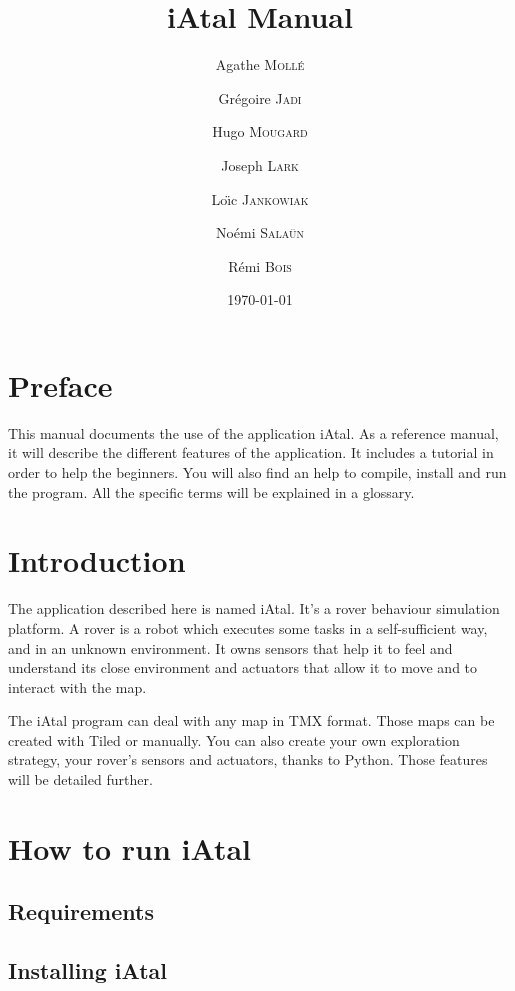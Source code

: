 \documentclass[a4paper,11pt]{article}
\title{iAtal Manual}
\author{Agathe \textsc{Moll\'e} \and Gr\'egoire \textsc{Jadi} \and Hugo \textsc{Mougard} \and Joseph \textsc{Lark} 
\and Lo\"\i c \textsc{Jankowiak} \and No\'emi \textsc{Sala\"un} \and R\'emi \textsc{Bois}}
\date{\today}
\begin{document}
\maketitle

\tableofcontents



\section*{Preface}
This manual documents the use of the application iAtal.  As a
reference manual, it will describe the different features of the
application. It includes a tutorial in order to help the
beginners. You will also find an help to compile, install and run the
program.  All the specific terms will be explained in a glossary.
  
\section*{Introduction}
The application described here is named iAtal. It's a rover behaviour
simulation platform.  A rover is a robot which executes some tasks in
a self-sufficient way, and in an unknown environment.  It owns sensors
that help it to feel and understand its close environment and
actuators that allow it to move and to interact with the map.


The iAtal program can deal with any map in TMX format. Those maps can
be created with Tiled %
or manually.  You can also create your own exploration strategy, your
rover's sensors and actuators, thanks to Python.  Those features will
be detailed further.

\section{How to run iAtal}

\subsection{Requirements}

\subsection{Installing iAtal}
\end{document}
